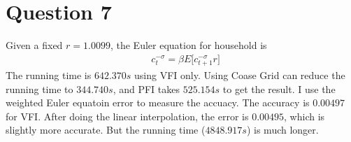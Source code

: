 \documentclass{article}
\begin{document}
\section*{\normalsize{Question 7}}
Given a fixed $r=1.0099$, the Euler equation for household is
\begin{equation*}
\begin{aligned}
&c_t^{-\sigma}=\beta E\big[c_{t+1}^{-\sigma}r\big]
\end{aligned}
\end{equation*}
The running time is $642.370s$ using VFI only. Using Coase Grid can reduce the running time to $344.740s$, and PFI takes $525.154s$ to get the result. I use the weighted Euler equatoin error to measure the accuacy. The accuracy is $0.00497$ for VFI. After doing the linear interpolation, the error is $0.00495$, which is slightly more accurate. But the running time ($4848.917s$) is much longer. 
\end{document}
